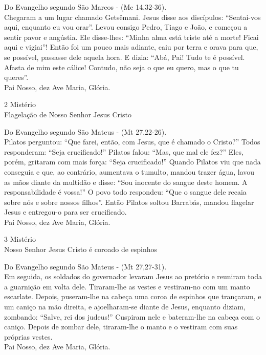 \begin{flushleft}
    Do Evangelho segundo São Marcos - (\textcolor{VioletRed3}{Mc 14,32-36}). \\
    \hfill{} \break{}
    Chegaram a um lugar chamado Getsêmani. Jesus disse aos discípulos: ``Sentai-vos aqui, enquanto eu vou orar''. Levou consigo Pedro, Tiago e João, e começou a sentir pavor e angústia. Ele disse-lhes: ``Minha alma está triste até a morte! Ficai aqui e vigiai''! Então foi um pouco mais adiante, caiu por terra e orava para que, se possível, passasse dele aquela hora. E dizia: ``Abá, Pai! Tudo te é possível. Afasta de mim este cálice! Contudo, não seja o que eu quero, mas o que tu queres''. \\
    \hfill{} \break{}
    Pai Nosso, dez Ave Maria, Glória.
\end{flushleft}
\begin{center}
    2\textordmasculine{} Mistério \\ Flagelação de Nosso Senhor Jesus Cristo
\end{center}
\begin{flushleft}
    Do Evangelho segundo São Mateus - (\textcolor{VioletRed3}{Mt 27,22-26}). \\
    \hfill{} \break{}
    Pilatos perguntou: ``Que farei, então, com Jesus, que é chamado o Cristo?'' Todos responderam: ``Seja crucificado!'' Pilatos falou: ``Mas, que mal ele fez?'' Eles, porém, gritaram com mais força: ``Seja crucificado!'' Quando Pilatos viu que nada conseguia e que, ao contrário, aumentava o tumulto, mandou trazer água, lavou as mãos diante da multidão e disse: ``Sou inocente do sangue deste homem. A responsabilidade é vossa!'' O povo todo respondeu: ``Que o sangue dele recaia sobre nós e sobre nossos filhos''. Então Pilatos soltou Barrabás, mandou flagelar Jesus e entregou-o para ser crucificado. \\
    \hfill{} \break{}
    Pai Nosso, dez Ave Maria, Glória.
\end{flushleft}
\newpage
\begin{center}
    3\textordmasculine{} Mistério \\ Nosso Senhor Jesus Cristo é coroado de espinhos
\end{center}
\begin{flushleft}
    Do Evangelho segundo São Mateus - (\textcolor{VioletRed3}{Mt 27,27-31}). \\
    \hfill{} \break{}
    Em seguida, os soldados do governador levaram Jesus ao pretório e reuniram toda a guarnição em volta dele. Tiraram-lhe as vestes e vestiram-no com um manto escarlate. Depois, puseram-lhe na cabeça uma coroa de espinhos que trançaram, e um caniço na mão direita, e ajoelharam-se diante de Jesus, enquanto diziam, zombando: ``Salve, rei dos judeus!'' Cuspiram nele e bateram-lhe na cabeça com o caniço. Depois de zombar dele, tiraram-lhe o manto e o vestiram com suas próprias vestes. \\
    \hfill{} \break{}
    Pai Nosso, dez Ave Maria, Glória.
\end{flushleft}
